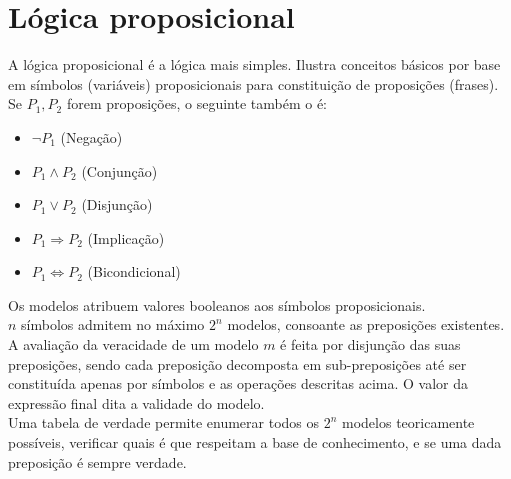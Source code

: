 \documentclass[]{report}
\begin{document}
\section{Lógica proposicional}
A lógica proposicional é a lógica mais simples. Ilustra conceitos básicos por base em símbolos (variáveis) proposicionais para constituição de proposições (frases).\\
Se $P_1, P_2$ forem proposições, o seguinte também o é:
\begin{itemize}
\item $\neg P_1$ (Negação)
\item $P_1 \wedge P_2$ (Conjunção)
\item $P_1 \vee P_2$ (Disjunção)
\item $P_1 \Rightarrow P_2$ (Implicação)
\item $P_1 \Leftrightarrow P_2$ (Bicondicional)
\end{itemize}
Os modelos atribuem valores booleanos aos símbolos proposicionais.\\
$n$ símbolos admitem no máximo $2^n$ modelos, consoante as preposições existentes.\\[0.5cm]
A avaliação da veracidade de um modelo $m$ é feita por disjunção das suas preposições, sendo cada preposição decomposta em sub-preposições até ser constituída apenas por símbolos e as operações descritas acima. O valor da expressão final dita a validade do modelo.\\[0.2cm]
Uma tabela de verdade permite enumerar todos os $2^n$ modelos teoricamente possíveis, verificar quais é que respeitam a base de conhecimento, e se uma dada preposição é sempre verdade.
\end{document}
